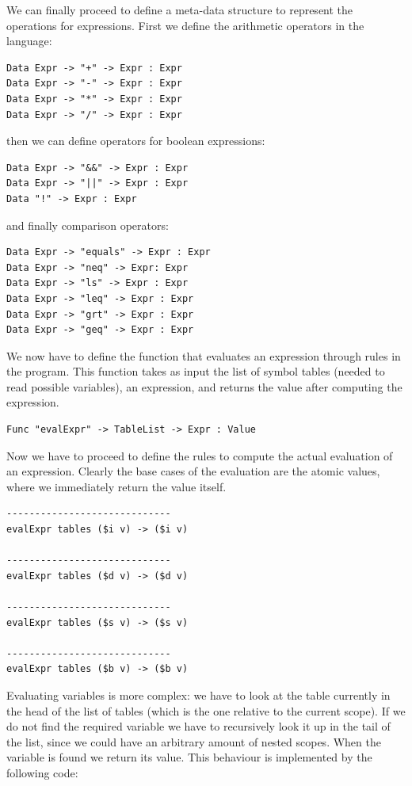 \noindent
We can finally proceed to define a meta-data structure to represent the operations for expressions. First we define the arithmetic operators in the language:

\begin{lstlisting}
Data Expr -> "+" -> Expr : Expr
Data Expr -> "-" -> Expr : Expr
Data Expr -> "*" -> Expr : Expr
Data Expr -> "/" -> Expr : Expr
\end{lstlisting}

\noindent
then we can define operators for boolean expressions:
\begin{lstlisting}
Data Expr -> "&&" -> Expr : Expr
Data Expr -> "||" -> Expr : Expr
Data "!" -> Expr : Expr
\end{lstlisting}

\noindent
and finally comparison operators:
\begin{lstlisting}
Data Expr -> "equals" -> Expr : Expr
Data Expr -> "neq" -> Expr: Expr
Data Expr -> "ls" -> Expr : Expr
Data Expr -> "leq" -> Expr : Expr
Data Expr -> "grt" -> Expr : Expr
Data Expr -> "geq" -> Expr : Expr
\end{lstlisting}

We now have to define the function that evaluates an expression through rules in the program. This function takes as input the list of symbol tables (needed to read possible variables), an expression, and returns the value after computing the expression.

\begin{lstlisting}
Func "evalExpr" -> TableList -> Expr : Value
\end{lstlisting}

\noindent
Now we have to proceed to define the rules to compute the actual evaluation of an expression. Clearly the base cases of the evaluation are the atomic values, where we immediately return the value itself.

\begin{lstlisting}
-----------------------------
evalExpr tables ($i v) -> ($i v)

-----------------------------
evalExpr tables ($d v) -> ($d v)

-----------------------------
evalExpr tables ($s v) -> ($s v)

-----------------------------
evalExpr tables ($b v) -> ($b v)
\end{lstlisting}

Evaluating variables is more complex: we have to look at the table currently in the head of the list of tables (which is the one relative to the current scope). If we do not find the required variable we have to recursively look it up in the tail of the list, since we could have an arbitrary amount of nested scopes. When the variable is found we return its value. This behaviour is implemented by the following code:

